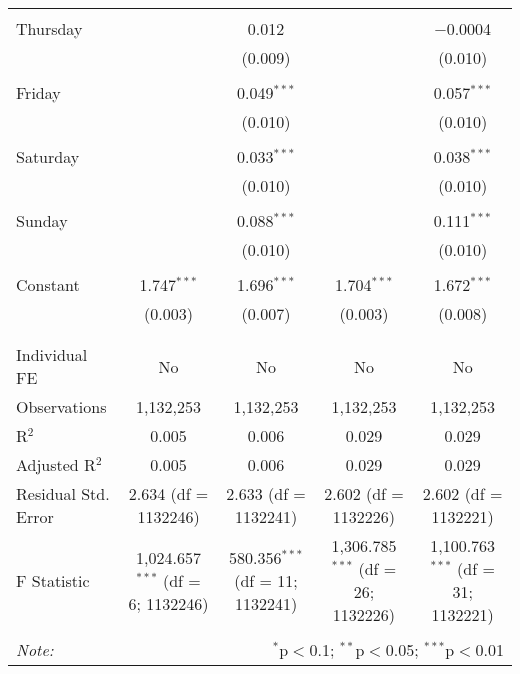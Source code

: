 \documentclass[
]{article}
\begin{document}
\begin{table}[!htbp]
{\begin{tabular}{@{\extracolsep{5pt}}lcccc}
  & & & & \\ 
 Thursday &  & 0.012 &  & $-$0.0004 \\ 
  &  & (0.009) &  & (0.010) \\ 
  & & & & \\ 
 Friday &  & 0.049$^{***}$ &  & 0.057$^{***}$ \\ 
  &  & (0.010) &  & (0.010) \\ 
  & & & & \\ 
 Saturday &  & 0.033$^{***}$ &  & 0.038$^{***}$ \\ 
  &  & (0.010) &  & (0.010) \\ 
  & & & & \\ 
 Sunday &  & 0.088$^{***}$ &  & 0.111$^{***}$ \\ 
  &  & (0.010) &  & (0.010) \\ 
  & & & & \\ 
 Constant & 1.747$^{***}$ & 1.696$^{***}$ & 1.704$^{***}$ & 1.672$^{***}$ \\ 
  & (0.003) & (0.007) & (0.003) & (0.008) \\ 
  & & & & \\ 
\hline \\[-1.8ex] 
Individual FE & No & No & No & No \\ 
Observations & 1,132,253 & 1,132,253 & 1,132,253 & 1,132,253 \\ 
R$^{2}$ & 0.005 & 0.006 & 0.029 & 0.029 \\ 
Adjusted R$^{2}$ & 0.005 & 0.006 & 0.029 & 0.029 \\ 
Residual Std. Error & 2.634 (df = 1132246) & 2.633 (df = 1132241) & 2.602 (df = 1132226) & 2.602 (df = 1132221) \\ 
F Statistic & 1,024.657$^{***}$ (df = 6; 1132246) & 580.356$^{***}$ (df = 11; 1132241) & 1,306.785$^{***}$ (df = 26; 1132226) & 1,100.763$^{***}$ (df = 31; 1132221) \\ 
\hline 
\hline \\[-1.8ex] 
\textit{Note:}  & \multicolumn{4}{r}{$^{*}$p$<$0.1; $^{**}$p$<$0.05; $^{***}$p$<$0.01} \\ 
\end{tabular}
} 
\end{table} 
\newpage
\end{document}
